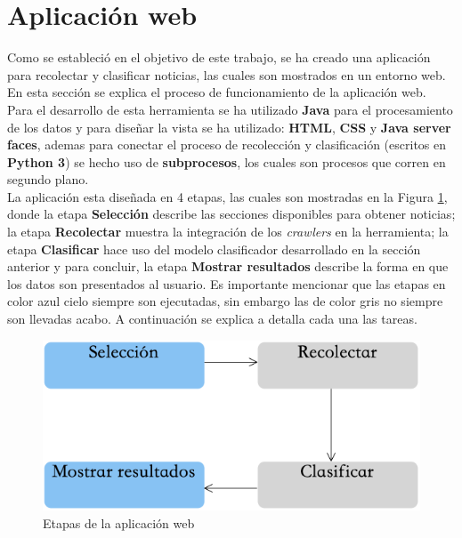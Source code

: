 \section[Aplicación]{Aplicación web}


Como se estableció en el objetivo de este trabajo, se ha creado una aplicación para recolectar y clasificar noticias, las cuales son mostrados en un entorno web. En esta sección se explica el proceso de funcionamiento de la aplicación web.\\

Para el desarrollo de esta  herramienta se ha utilizado \textbf{Java} para el procesamiento de los datos y para diseñar la vista se ha utilizado: \textbf{HTML}, \textbf{CSS} y \textbf{Java server faces}, ademas para conectar el proceso de recolección y clasificación (escritos en \textbf{Python 3}) se hecho uso de \textbf{subprocesos}, los cuales son procesos que corren en segundo plano.\\

La aplicación esta diseñada en 4 etapas, las cuales son mostradas en la Figura \ref{fig:procesoAppWeb}, donde la etapa \textbf{Selección} describe las secciones disponibles para obtener noticias; la etapa \textbf{Recolectar} muestra la integración de los \textit{crawlers} en la herramienta; la etapa \textbf{Clasificar} hace uso del modelo clasificador desarrollado en la sección anterior y para concluir, la etapa \textbf{Mostrar resultados} describe la forma en que los datos son presentados al usuario. Es importante mencionar que las etapas en color azul cielo siempre son ejecutadas, sin embargo las de color gris no siempre son llevadas acabo. A continuación se explica a detalla cada una las tareas.


\begin{figure}[H]
	\centering
	\includegraphics[scale=0.55]{imagenes/Capitulo5/AplicacionWeb/ProcesoAplicacionWeb.png}
	\caption{Etapas de la aplicación web}
	\label{fig:procesoAppWeb}
\end{figure}

